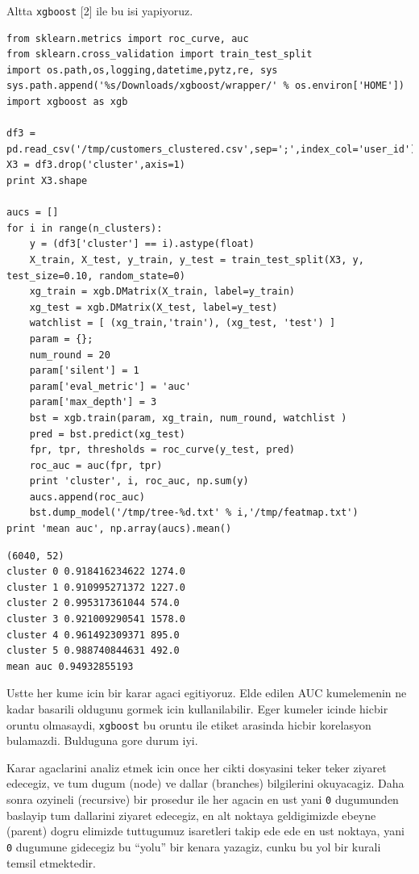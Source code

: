 \documentclass[12pt,fleqn]{article}\usepackage{../common}
\begin{document}
Altta \verb!xgboost! [2] ile bu isi yapiyoruz. 

\begin{verbatim}
from sklearn.metrics import roc_curve, auc
from sklearn.cross_validation import train_test_split
import os.path,os,logging,datetime,pytz,re, sys
sys.path.append('%s/Downloads/xgboost/wrapper/' % os.environ['HOME'])
import xgboost as xgb

df3 = pd.read_csv('/tmp/customers_clustered.csv',sep=';',index_col='user_id')
X3 = df3.drop('cluster',axis=1)
print X3.shape

aucs = []
for i in range(n_clusters):
    y = (df3['cluster'] == i).astype(float)    
    X_train, X_test, y_train, y_test = train_test_split(X3, y, test_size=0.10, random_state=0)
    xg_train = xgb.DMatrix(X_train, label=y_train)
    xg_test = xgb.DMatrix(X_test, label=y_test)    
    watchlist = [ (xg_train,'train'), (xg_test, 'test') ]    
    param = {}; 
    num_round = 20
    param['silent'] = 1
    param['eval_metric'] = 'auc'
    param['max_depth'] = 3
    bst = xgb.train(param, xg_train, num_round, watchlist )
    pred = bst.predict(xg_test)
    fpr, tpr, thresholds = roc_curve(y_test, pred)
    roc_auc = auc(fpr, tpr)
    print 'cluster', i, roc_auc, np.sum(y)
    aucs.append(roc_auc)
    bst.dump_model('/tmp/tree-%d.txt' % i,'/tmp/featmap.txt')
print 'mean auc', np.array(aucs).mean()
\end{verbatim}

\begin{verbatim}
(6040, 52)
cluster 0 0.918416234622 1274.0
cluster 1 0.910995271372 1227.0
cluster 2 0.995317361044 574.0
cluster 3 0.921009290541 1578.0
cluster 4 0.961492309371 895.0
cluster 5 0.988740844631 492.0
mean auc 0.94932855193
\end{verbatim}

Ustte her kume icin bir karar agaci egitiyoruz. Elde edilen AUC kumelemenin
ne kadar basarili oldugunu gormek icin kullanilabilir. Eger kumeler icinde
hicbir oruntu olmasaydi, \verb!xgboost! bu oruntu ile etiket arasinda
hicbir korelasyon bulamazdi. Bulduguna gore durum iyi.

Karar agaclarini analiz etmek icin once her cikti dosyasini teker teker
ziyaret edecegiz, ve tum dugum (node) ve dallar (branches) bilgilerini
okuyacagiz. Daha sonra ozyineli (recursive) bir prosedur ile her agacin en
ust yani \verb!0! dugumunden baslayip tum dallarini ziyaret edecegiz, en
alt noktaya geldigimizde ebeyne (parent) dogru elimizde tuttugumuz
isaretleri takip ede ede en ust noktaya, yani \verb!0! dugumune gidecegiz
bu ``yolu'' bir kenara yazagiz, cunku bu yol bir kurali temsil etmektedir.
\end{document}
